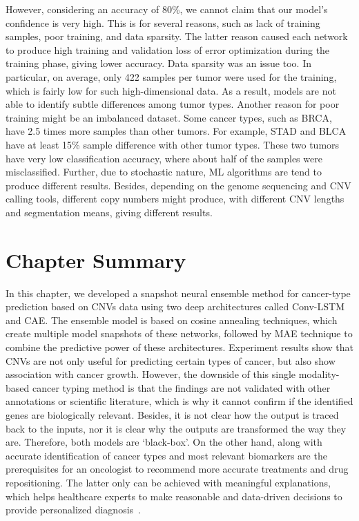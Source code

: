 \hspace*{3.5mm} However, considering an accuracy of 80\%, we cannot claim that our model’s confidence is very high. This is for several reasons, such as lack of training samples, poor training, and data sparsity. The latter reason caused each network to produce high training and validation loss of error optimization during the training phase, giving lower accuracy. Data sparsity was an issue too. In particular, on average, only 422 samples per tumor were used for the training, which is fairly low for such high-dimensional data. As a result, models are not able to identify subtle differences among tumor types. 
Another reason for poor training might be an imbalanced dataset. Some cancer types, such as BRCA, have 2.5 times more samples than other tumors. For example, STAD and BLCA have at least 15\% sample difference with other tumor types. These two tumors have very low classification accuracy, where about half of the samples were misclassified. Further, due to stochastic nature, ML algorithms are tend to produce different results. Besides, depending on the genome sequencing and CNV calling tools, different copy numbers might produce, with different CNV lengths and segmentation means, giving different results.

\section{Chapter Summary} \label{chapter_3:conclusion}
In this chapter, we developed a snapshot neural ensemble method for cancer-type prediction based on CNVs data using two deep architectures called Conv-LSTM and CAE. The ensemble model is based on cosine annealing techniques, which create multiple model snapshots of these networks, followed by MAE technique to combine the predictive power of these architectures.  Experiment results show that CNVs are not only useful for predicting certain types of cancer, but also show association with cancer growth. %
However, the downside of this single modality-based cancer typing method is that the findings are not validated with other annotations or scientific literature, which is why it cannot confirm if the identified genes are biologically relevant. Besides, it is not clear how the output is traced back to the inputs, nor it is clear why the outputs are transformed the way they are. Therefore, both models are `black-box'. On the other hand, along with accurate identification of cancer types and most relevant biomarkers are the prerequisites for an oncologist to recommend more accurate treatments and drug repositioning. The latter only can be achieved with meaningful explanations, which helps healthcare experts to make reasonable and data-driven decisions to provide personalized diagnosis~\cite{stiglic2020interpretability}.  

